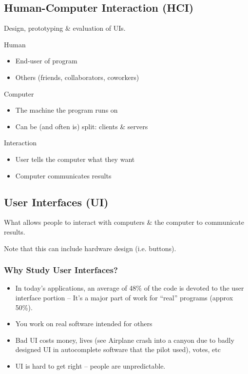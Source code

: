\subsection{Human-Computer Interaction (HCI)}
Design, prototyping \& evaluation of UIs.

Human
\begin{itemize}
    \item End-user of program
    \item Others (friends, collaborators, coworkers)
\end{itemize}

Computer
\begin{itemize}
    \item The machine the program runs on
    \item Can be (and often is) split: clients \& servers
\end{itemize}

Interaction
\begin{itemize}
    \item User tells the computer what they want
    \item Computer communicates results
\end{itemize}

\subsection{User Interfaces (UI)}
What allows people to interact with computers \& the computer to communicate results.

Note that this can include hardware design (i.e. buttons).

\subsubsection{Why Study User Interfaces?}
\begin{itemize}
    \item In today's applications, an average of 48\% of the code is devoted to the user interface portion -- It's a major part of work for ``real'' programs (approx 50\%).
    \item You work on real software intended for others
    \item Bad UI costs money, lives (see Airplane crash into a canyon due to badly designed UI in autocomplete software that the pilot used), votes, etc
    \item UI is hard to get right -- people are unpredictable.
\end{itemize}


